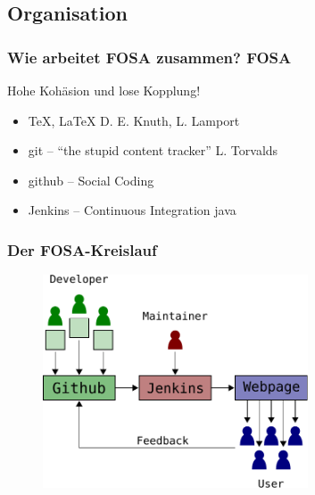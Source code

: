 \subsection{Organisation}
\begin{frame}
	\frametitle{Wie arbeitet FOSA zusammen? 
		\hfill{} \footnotesize{FOSA}}
	\begin{block}{Hohe Kohäsion und lose Kopplung!}
		\begin{itemize}
			\item \TeX, \LaTeX 
				\hfill{} 
				\footnotesize{D. E. Knuth, L. Lamport} 
				\normalsize
			\item git -- "`the stupid content tracker"'
				\hfill{}
				\footnotesize{L. Torvalds}
				\normalsize
			\item github -- Social Coding
			\item Jenkins -- Continuous Integration
				\hfill{}
				\footnotesize{java}
				\normalsize
		\end{itemize}
	\end{block}
\end{frame}

\begin{frame}
	\frametitle{Der FOSA-Kreislauf}
	\begin{figure}
		\centering
		\includegraphics[width=0.7\textwidth]{fig/fosa-loop.pdf}

	\end{figure}
\end{frame}

